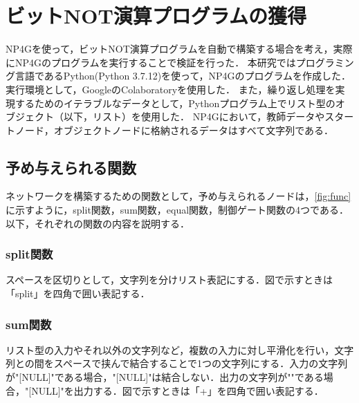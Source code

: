 \documentclass[exploratorypaper]{jsaiart} %
\begin{document}
\section{ビットNOT演算プログラムの獲得}
NP4Gを使って，ビットNOT演算プログラムを自動で構築する場合を考え，実際にNP4Gのプログラムを実行することで検証を行った．
本研究ではプログラミング言語であるPython(Python 3.7.12)を使って，NP4Gのプログラムを作成した．実行環境として，GoogleのColaboratoryを使用した．
また，繰り返し処理を実現するためのイテラブルなデータとして，Pythonプログラム上でリスト型のオブジェクト（以下，リスト）を使用した．
NP4Gにおいて，教師データやスタートノード，オブジェクトノードに格納されるデータはすべて文字列である．

\subsection{予め与えられる関数}
ネットワークを構築するための関数として，予め与えられるノードは，\ref{fig:func}に示すように，split関数，sum関数，equal関数，制御ゲート関数の4つである．以下，それぞれの関数の内容を説明する．
\subsubsection{split関数}
スペースを区切りとして，文字列を分けリスト表記にする．図で示すときは「split」を四角で囲い表記する．


\subsubsection{sum関数}
リスト型の入力やそれ以外の文字列など，複数の入力に対し平滑化を行い，文字列との間をスペースで挟んで結合することで1つの文字列にする．入力の文字列が"[NULL]"である場合，"[NULL]"は結合しない．出力の文字列が""である場合，"[NULL]"を出力する．図で示すときは「+」を四角で囲い表記する．
\end{document}
